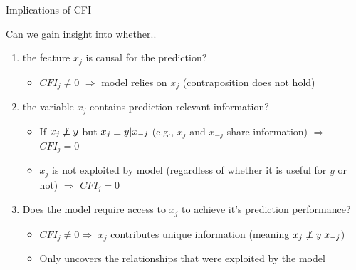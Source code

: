 \documentclass[11pt,compress,t,notes=noshow, aspectratio=169, xcolor=table]{beamer}
\begin{document}
\begin{frame}{Implications of CFI}

Can we gain insight into whether..

\begin{enumerate}
    \item<1-3> the feature $x_j$ is causal for the prediction?
    \begin{itemize}
      \item $CFI_j \neq 0$ $\Rightarrow$ model relies on $x_j$ (contraposition does not hold)
    \end{itemize}
    \item<2-3> the variable $x_j$ contains prediction-relevant information?
    \begin{itemize}
      \item If $x_j \not \indep y$ but $x_j \indep y | x_{-j}$ (e.g., $x_j$ and $x_{-j}$ share information) $\Rightarrow$ $CFI_j = 0$
      \item  $x_{j}$ is not exploited by model (regardless of whether it is useful for $y$ or not) $\Rightarrow$ $CFI_j = 0$
    \end{itemize}
    \item<3> Does the model require access to $x_j$ to achieve it's prediction performance?
\begin{itemize}
      \item $CFI_j \neq 0 \Rightarrow$ $x_j$ contributes unique information (meaning $x_j \not \indep y | x_{-j}$)
      \item Only uncovers the relationships that were exploited by the model
    \end{itemize}
\end{enumerate}
\end{frame}
\end{document}
